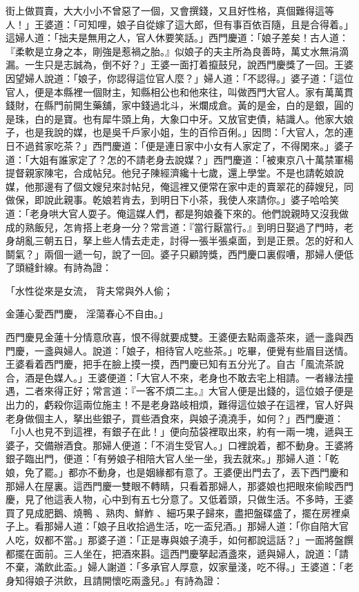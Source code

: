 \begin{showcontents}{}
街上做買賣，大大小小不曾惡了一個，又會撰錢，又且好性格，真個難得這等人！」王婆道：「可知哩，娘子自從嫁了這大郎，但有事百依百隨，且是合得着。」這婦人道：「拙夫是無用之人，官人休要笑話。」西門慶道：「娘子差矣！古人道：『柔軟是立身之本，剛強是惹禍之胎。』似娘子的夫主所為良善時，萬丈水無涓滴漏。一生只是志誠為，倒不好？」王婆一面打着攛鼓兒，說西門慶獎了一回。王婆因望婦人說道：「娘子，你認得這位官人麼？」婦人道：「不認得。」婆子道：「這位官人，便是本縣裡一個財主，知縣相公也和他來往，叫做西門大官人。家有萬萬貫錢財，在縣門前開生藥舖，家中錢過北斗，米爛成倉。黃的是金，白的是銀，圓的是珠，白的是寶。也有犀牛頭上角，大象口中牙。又放官吏債，結識人。他家大娘子，也是我說的媒，也是吳千戶家小姐，生的百伶百俐。」因問：「大官人，怎的連日不過貧家吃茶？」西門慶道：「便是連日家中小女有人家定了，不得閑來。」婆子道：「大姐有誰家定了？怎的不請老身去說媒？」西門慶道：「被東京八十萬禁軍楊提督親家陳宅，合成帖兒。他兒子陳經濟纔十七歲，還上學堂。不是也請乾娘說媒，他那邊有了個文嫂兒來討帖兒，俺這裡又便常在家中走的賣翠花的薛嫂兒，同做保，即說此親事。乾娘若肯去，到明日下小茶，我使人來請你。」婆子哈哈笑道：「老身哄大官人耍子。俺這媒人們，都是狗娘養下來的。他們說親時又沒我做成的熟飯兒，怎肯搭上老身一分？常言道：『當行厭當行。』到明日娶過了門時，老身胡亂三朝五日，拏上些人情去走走，討得一張半張桌面，到是正景。怎的好和人鬬氣？」兩個一遞一句，說了一回。婆子只顧誇獎，西門慶口裏假嘈，那婦人便低了頭縫針線。有詩為證：

「水性從來是女流，  背夫常與外人偷；

金蓮心愛西門慶，  淫蕩春心不自由。」

西門慶見金蓮十分情意欣喜，恨不得就要成雙。王婆便去點兩盞茶來，遞一盞與西門慶，一盞與婦人。說道：「娘子，相待官人吃些茶。」吃畢，便覺有些眉目送情。王婆看着西門慶，把手在臉上摸一摸，西門慶已知有五分光了。自古「風流茶說合，酒是色媒人。」王婆便道：「大官人不來，老身也不敢去宅上相請。一者緣法撞遇，二者來得正好；常言道：『一客不煩二主。』大官人便是出錢的，這位娘子便是出力的，虧殺你這兩位施主！不是老身路岐相煩，難得這位娘子在這裡，官人好與老身做個主人，拏出些銀子，買些酒食來，與娘子澆澆手，如何？」西門慶道：「小人也見不到這裡，有銀子在此！」便向茄袋裡取出來，約有一兩一塊，遞與王婆子，交備辦酒食。那婦人便道：「不消生受官人。」口裡說着，都不動身。王婆將銀子臨出門，便道：「有勞娘子相陪大官人坐一坐，我去就來。」那婦人道：「乾娘，免了罷。」都亦不動身，也是姻緣都有意了。王婆便出門去了，丟下西門慶和那婦人在屋裏。這西門慶一雙眼不轉睛，只看着那婦人，那婆娘也把眼來偷睃西門慶，見了他這表人物，心中到有五七分意了。又低着頭，只做生活。不多時，王婆買了見成肥鵝、燒鴨 、熟肉、鮮鮓 、細巧果子歸來，盡把盤碟盛了，擺在房裡桌子上。看那婦人道：「娘子且收拾過生活，吃一盃兒酒。」那婦人道：「你自陪大官人吃，奴都不當。」那婆子道：「正是專與娘子澆手，如何都說這話？」一面將盤饌都擺在面前。三人坐在，把酒來斟。這西門慶拏起酒盞來，遞與婦人，說道：「請不棄，滿飲此盃。」婦人謝道：「多承官人厚意，奴家量淺，吃不得。」王婆道：「老身知得娘子洪飲，且請開懷吃兩盞兒。」有詩為證：


\end{showcontents}
